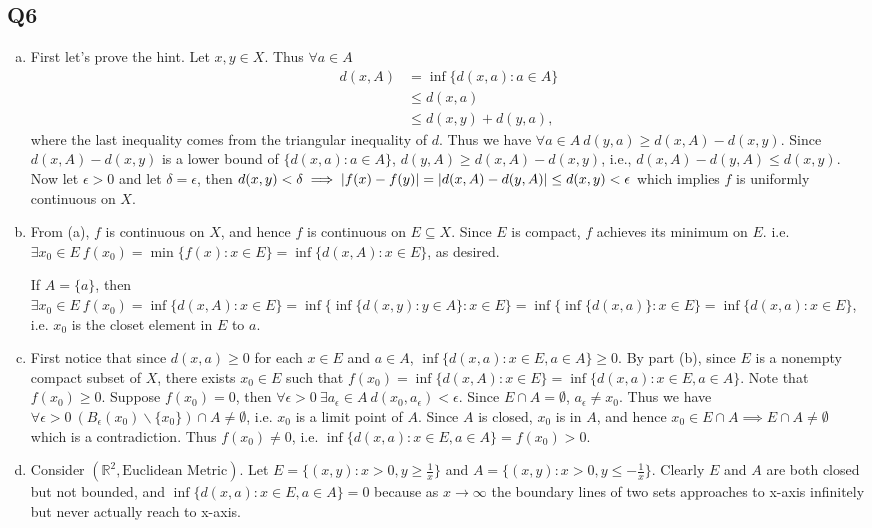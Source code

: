 \documentclass[12pt,lettersize]{article}
\newcommand{\R}{\mathbb{R}}
\begin{document}
	\subsection*{Q6}
	\begin{enumerate}[(a)]
		\item First let's prove the hint. Let $x,y\in X$. Thus $\forall a\in A$
		\begin{align*}
			d(x,A) &= \inf\{d(x,a): a\in A\}\\
				   &\leq d(x,a)\\
				   &\leq d(x,y)+d(y,a),
		\end{align*} 
		where the last inequality comes from the triangular inequality of $d$. Thus we have $\forall a\in A\ d(y,a)\geq d(x,A)-d(x,y)$. Since $d(x,A)-d(x,y)$ is a lower bound of $\{d(x,a): a\in A\}$, $d(y,A)\geq d(x,A)-d(x,y)$, i.e., $d(x,A)-d(y,A)\leq d(x,y)$. Now let $\epsilon>0$ and let $\delta=\epsilon$, then $d(x,y)<\delta\implies \abs{f(x)-f(y)}=\abs{d(x,A)-d(y,A)}\leq d(x,y)<\epsilon$ which implies $f$ is uniformly continuous on $X$.
		
		\item From (a), $f$ is continuous on $X$, and hence $f$ is continuous on $E\subseteq X$. Since $E$ is compact, $f$ achieves its minimum on $E$. i.e. $\exists x_0\in E\ f(x_0)=\min\{f(x): x\in E\}=\inf\{d(x,A):x\in E\}$, as desired.\smallskip
		
		If $A=\{a\}$, then $\exists x_0\in E\ f(x_0)=\inf\{d(x,A):x\in E\}=\inf\{\inf\{d(x,y):y\in A\}: x\in E\}=\inf\{\inf\{d(x,a)\}: x\in E\}=\inf\{d(x,a): x\in E\}$, i.e. $x_0$ is the closet element in $E$ to $a$.
		
		\item First notice that since $d(x,a)\geq0$ for each $x\in E$ and $a\in A$, $\inf\{d(x,a): x\in E, a\in A\}\geq 0$. By part (b), since $E$ is a nonempty compact subset of $X$, there exists $x_0\in E$ such that $f(x_0)=\inf\{d(x,A): x\in E\}=\inf\{d(x,a): x\in E, a\in A\}$. Note that $f(x_0)\geq 0$. Suppose $f(x_0)=0$, then $\forall \epsilon>0\ \exists a_\epsilon\in A\ d(x_0,a_\epsilon)<\epsilon$. Since $E\cap A=\emptyset$, $a_\epsilon\neq x_0$. Thus we have $\forall\epsilon>0\ (B_\epsilon(x_0)\backslash\{x_0\})\cap A\neq\emptyset$, i.e. $x_0$ is a limit point of $A$. Since $A$ is closed, $x_0$ is in $A$, and hence $x_0\in E\cap A\implies E\cap A\neq\emptyset$ which is a contradiction. Thus $f(x_0)\neq 0$, i.e. $\inf\{d(x,a): x\in E, a\in A\}=f(x_0)>0$.
		
		\item Consider $(\R^2, \text{Euclidean Metric})$. Let $E=\{(x,y): x>0, y\geq\frac{1}{x}\}$ and $A=\{(x,y): x>0, y\leq-\frac{1}{x}\}$. Clearly $E$ and $A$ are both closed but not bounded, and $\inf\{d(x,a):x\in E, a\in A\}=0$ because as $x\rightarrow\infty$ the boundary lines of two sets approaches to x-axis infinitely but never actually reach to x-axis.
	\end{enumerate}
	\newpage
	
\end{document}
